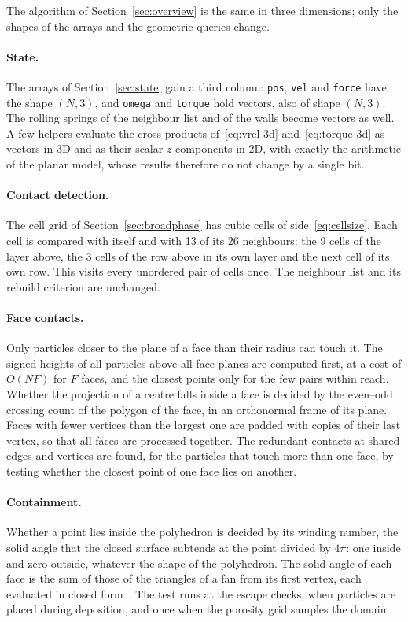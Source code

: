 The algorithm of Section~\ref{sec:overview} is the same in three dimensions; only the shapes of the arrays and the geometric queries change.

\paragraph{State.}
The arrays of Section~\ref{sec:state} gain a third column: \texttt{pos}, \texttt{vel} and \texttt{force} have the shape $(N,3)$, and \texttt{omega} and \texttt{torque} hold vectors, also of shape $(N,3)$.
The rolling springs of the neighbour list and of the walls become vectors as well.
A few helpers evaluate the cross products of~\eqref{eq:vrel-3d} and~\eqref{eq:torque-3d} as vectors in 3D and as their scalar $z$ components in 2D, with exactly the arithmetic of the planar model, whose results therefore do not change by a single bit.

\paragraph{Contact detection.}
The cell grid of Section~\ref{sec:broadphase} has cubic cells of side~\eqref{eq:cellsize}.
Each cell is compared with itself and with 13 of its 26 neighbours: the 9 cells of the layer above, the 3 cells of the row above in its own layer and the next cell of its own row.
This visits every unordered pair of cells once.
The neighbour list and its rebuild criterion are unchanged.

\paragraph{Face contacts.}
Only particles closer to the plane of a face than their radius can touch it.
The signed heights of all particles above all face planes are computed first, at a cost of $O(NF)$ for $F$ faces, and the closest points only for the few pairs within reach.
Whether the projection of a centre falls inside a face is decided by the even--odd crossing count of the polygon of the face, in an orthonormal frame of its plane.
Faces with fewer vertices than the largest one are padded with copies of their last vertex, so that all faces are processed together.
The redundant contacts at shared edges and vertices are found, for the particles that touch more than one face, by testing whether the closest point of one face lies on another.

\paragraph{Containment.}
Whether a point lies inside the polyhedron is decided by its winding number, the solid angle that the closed surface subtends at the point divided by $4\pi$: one inside and zero outside, whatever the shape of the polyhedron.
The solid angle of each face is the sum of those of the triangles of a fan from its first vertex, each evaluated in closed form~\cite{vanoosterom1983}.
The test runs at the escape checks, when particles are placed during deposition, and once when the porosity grid samples the domain.

